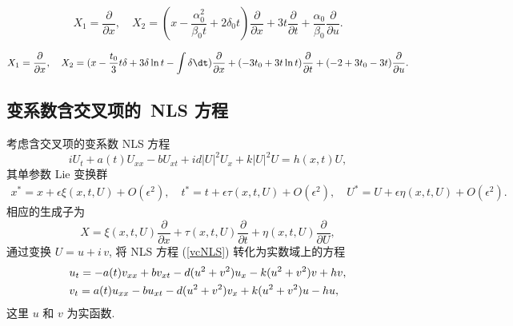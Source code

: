 $$X_1=\frac{\partial}{\partial x},\quad X_2=(x-\frac{\alpha_0^2}{\beta_0 t}+2\delta_0 t)\frac{\partial}{\partial x}+3t\frac{\partial}{\partial t}+\frac{\alpha_0}{\beta_0}\frac{\partial}{\partial u}.$$

$$X_1=\frac{\partial}{\partial x},\quad
X_2=(x-\frac{t_0}{3}t\delta+3\delta\ln t-\int \delta\dt)\frac{\partial}{\partial x}+(-3t_0+3t\ln t)\frac{\partial}{\partial t}+(-2+3t_0-3t)\frac{\partial}{\partial u}.$$


\subsection{变系数含交叉项的~NLS 方程}

考虑含交叉项的变系数 NLS 方程
\begin{equation}\label{vcNLS}
i U_t+a(t)U_{xx}-b U_{xt}+i d|U|^2U_x+k |U|^2U=h(x,t)U,
\end{equation}
其单参数 Lie 变换群
\begin{align}\label{Lie-T}
x^*=x+\epsilon \xi(x,t,U)+O(\epsilon^2),\quad t^*= t+\epsilon \tau(x,t,U)+O(\epsilon^2),\quad U^*= U+\epsilon \eta(x,t,U)+O(\epsilon^2).
\end{align}
相应的生成子为
\begin{equation}
X=\xi(x,t,U)\frac{\partial}{\partial x}+\tau(x,t,U)\frac{\partial}{\partial t}+\eta(x,t,U)\frac{\partial}{\partial U},
\end{equation}
通过变换 $U=u+i\,v$, 将 NLS 方程 (\ref{vcNLS}) 转化为实数域上的方程
\begin{align}\label{real-NLS}
&u_t=-a(t)v_{xx}+bv_{xt}-d(u^2+v^2)u_x-k(u^2+v^2)v+hv,\notag\\
&v_t=a(t)u_{xx}-bu_{xt}-d(u^2+v^2)v_x+k(u^2+v^2)u-hu,
\end{align}
这里 $u$ 和 $v$ 为实函数.

